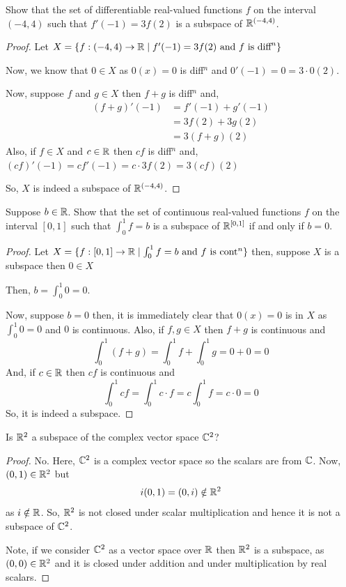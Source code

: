\begin{exercise}
Show that the set of differentiable real-valued functions $f$ on the interval $(-4, 4)$ such that $f'(-1) = 3f(2)$ is a subspace of $\mathbb{R}^{(-4,4)}$.
\end{exercise}

\begin{proof}
Let $X = \{f : (-4,4) \to \mathbb{R} \mid f'(-1) = 3f(2) \text{ and } f \text{ is diff}^n\}$

Now, we know that $0 \in X$ as $0(x) = 0$ is diff$^n$ and $0'(-1) = 0 = 3 \cdot 0(2)$.

Now, suppose $f$ and $g \in X$ then $f+g$ is diff$^n$ and,
\begin{align*}
(f+g)'(-1) &= f'(-1) + g'(-1) \\
&= 3f(2) + 3g(2) \\
&= 3(f+g)(2)
\end{align*}
Also, if $f \in X$ and $c \in \mathbb{R}$ then $cf$ is diff$^n$ and, $(cf)'(-1) = c f'(-1) = c \cdot 3f(2) = 3(cf)(2)$

So, $X$ is indeed a subspace of $\mathbb{R}^{(-4,4)}$.
\end{proof}

\begin{exercise}
Suppose $b \in \mathbb{R}$. Show that the set of continuous real-valued functions $f$ on the interval $[0, 1]$ such that $\int_0^1 f = b$ is a subspace of $\mathbb{R}^{[0,1]}$ if and only if $b = 0$.
\end{exercise}

\begin{proof}
Let $X = \{f : [0,1] \to \mathbb{R} \mid \int_0^1 f = b \text{ and } f \text{ is cont}^n\}$ then, suppose $X$ is a subspace then $0 \in X$

Then, $b = \int_0^1 0 = 0$.

Now, suppose $b = 0$ then, it is immediately clear that $0(x) = 0$ is in $X$ as $\int_0^1 0 = 0$ and $0$ is continuous. Also, if $f, g \in X$ then $f+g$ is continuous and
\[
\int_0^1 (f+g) = \int_0^1 f + \int_0^1 g = 0 + 0 = 0
\]
And, if $c \in \mathbb{R}$ then $cf$ is continuous and
\[
\int_0^1 cf = \int_0^1 c \cdot f = c \int_0^1 f = c \cdot 0 = 0
\]
So, it is indeed a subspace.
\end{proof}

\begin{exercise}
Is $\mathbb{R}^2$ a subspace of the complex vector space $\mathbb{C}^2$?
\end{exercise}

\begin{proof}
No. Here, $\mathbb{C}^2$ is a complex vector space so the scalars are from $\mathbb{C}$. Now, $(0,1) \in \mathbb{R}^2$ but
\[
i(0,1) = (0,i) \notin \mathbb{R}^2
\]
as $i \notin \mathbb{R}$. So, $\mathbb{R}^2$ is not closed under scalar multiplication and hence it is not a subspace of $\mathbb{C}^2$.

Note, if we consider $\mathbb{C}^2$ as a vector space over $\mathbb{R}$ then $\mathbb{R}^2$ is a subspace, as $(0,0) \in \mathbb{R}^2$ and it is closed under addition and under multiplication by real scalars.
\end{proof}

